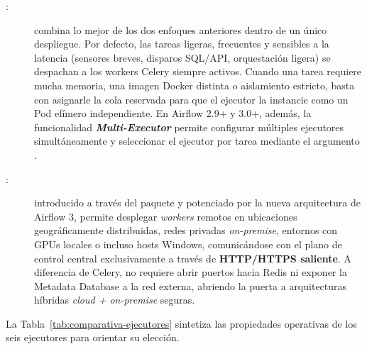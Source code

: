 \begin{description}
  \item[:] combina lo mejor de los dos enfoques anteriores dentro de un único despliegue. Por defecto, las tareas ligeras, frecuentes y sensibles a la latencia (sensores breves, disparos SQL/API, orquestación ligera) se despachan a los workers Celery siempre activos. Cuando una tarea requiere mucha memoria, una imagen Docker distinta o aislamiento estricto, basta con asignarle la cola reservada  para que el ejecutor la instancie como un Pod efímero independiente. En Airflow 2.9+ y 3.0+, además, la funcionalidad \textbf{\textit{Multi-Executor}} permite configurar múltiples ejecutores simultáneamente y seleccionar el ejecutor por tarea mediante el argumento .

  \item[{ :}] introducido a través del paquete  y potenciado por la nueva arquitectura de Airflow 3, permite desplegar \textit{workers} remotos en ubicaciones geográficamente distribuidas, redes privadas \textit{on-premise}, entornos con GPUs locales o incluso hosts Windows, comunicándose con el plano de control central exclusivamente a través de \textbf{HTTP/HTTPS saliente}. A diferencia de Celery, no requiere abrir puertos hacia Redis ni exponer la Metadata Database a la red externa, abriendo la puerta a arquitecturas híbridas \textit{cloud + on-premise} seguras.
\end{description}

La Tabla~\ref{tab:comparativa-ejecutores} sintetiza las propiedades operativas de los seis ejecutores para orientar su elección.

